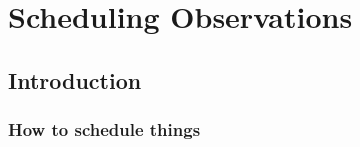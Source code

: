 \chapter{Scheduling Observations}
\label{chap:scheduling}
\chaptoc{}


\newpage
\section{Introduction}
\label{sec:scheduling_intro}
\begin{colsection}


\begin{colsection}


\end{colsection}


\subsection{How to schedule things}
\label{sec:scheduling}
\begin{colsection}


\end{colsection}


\end{colsection}


\newpage
